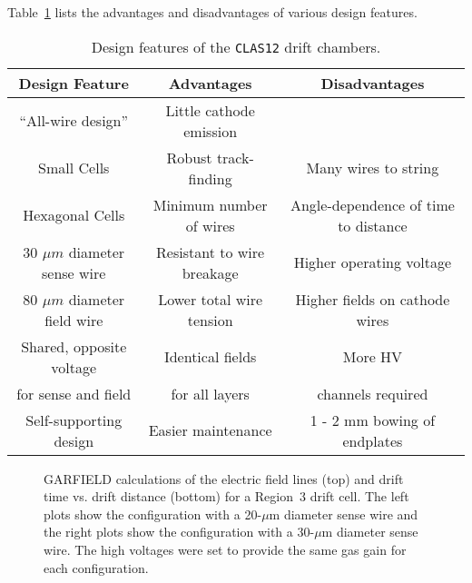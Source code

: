 Table~\ref{fwd-dc-design-features} lists the advantages and disadvantages
of various design features.
\begin{table}[ht]
\begin{center}
\begin{tabular} {||c|c|c||} \hline \hline
{\bf Design Feature  }       &{\bf Advantages} &{\bf Disadvantages}\\ \hline
``All-wire design'' & Little cathode emission & \\ \hline
Small Cells & Robust track-finding  & Many wires to string \\ \hline
Hexagonal Cells & Minimum number of wires  & Angle-dependence of time to distance  \\ \hline
30 $\mu m$ diameter sense wire & Resistant to wire breakage & Higher operating voltage \\ \hline
80 $\mu m$ diameter field wire & Lower total wire tension & Higher fields on cathode wires \\ \hline
Shared, opposite voltage  & Identical fields & More HV \\
for sense and field & for all layers & channels required \\ \hline
Self-supporting design & Easier maintenance & 1 - 2 mm bowing of endplates \\ \hline
\end{tabular}
\caption{\small{Design features of the {\tt CLAS12} drift chambers.}}
\label{fwd-dc-design-features}
\end{center}
\end{table}

\begin{figure}[htbp]
\vspace{10.0cm}
\caption{\small{GARFIELD calculations of the electric field lines (top)
and drift time vs. drift distance (bottom) for a Region~3 drift cell.  The 
left plots show the configuration with a 20-$\mu$m diameter sense wire and 
the right plots show the configuration with a 30-$\mu$m diameter sense wire.
The high voltages were set to provide the same gas gain for each
configuration.}}
\label{garfield-20-vs-30-micron}
\end{figure}


